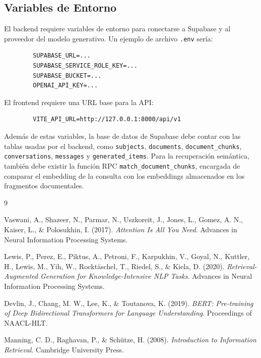 \documentclass[12pt, letterpaper]{article}
\begin{document}
	\subsection{Variables de Entorno}
	
	El backend requiere variables de entorno para conectarse a Supabase y al proveedor del modelo generativo. Un ejemplo de archivo \texttt{.env} sería:
	
	\begin{lstlisting}
		SUPABASE_URL=...
		SUPABASE_SERVICE_ROLE_KEY=...
		SUPABASE_BUCKET=...
		OPENAI_API_KEY=...
	\end{lstlisting}
	
	El frontend requiere una URL base para la API:
	
	\begin{lstlisting}
		VITE_API_URL=http://127.0.0.1:8000/api/v1
	\end{lstlisting}
	
	Además de estas variables, la base de datos de Supabase debe contar con las tablas usadas por el backend, como \texttt{subjects}, \texttt{documents}, \texttt{document\_chunks}, \texttt{conversations}, \texttt{messages} y \texttt{generated\_items}. Para la recuperación semántica, también debe existir la función RPC \texttt{match\_document\_chunks}, encargada de comparar el embedding de la consulta con los embeddings almacenados en los fragmentos documentales.
	
	
	
	
	\begin{thebibliography}{9}
		
		Vaswani, A., Shazeer, N., Parmar, N., Uszkoreit, J., Jones, L., Gomez, A. N., Kaiser, L., \& Polosukhin, I. (2017).
		\textit{Attention Is All You Need}.
		Advances in Neural Information Processing Systems.
		
		Lewis, P., Perez, E., Piktus, A., Petroni, F., Karpukhin, V., Goyal, N., Kuttler, H., Lewis, M., Yih, W., Rocktäschel, T., Riedel, S., \& Kiela, D. (2020).
		\textit{Retrieval-Augmented Generation for Knowledge-Intensive NLP Tasks}.
		Advances in Neural Information Processing Systems.
		
		Devlin, J., Chang, M. W., Lee, K., \& Toutanova, K. (2019).
		\textit{BERT: Pre-training of Deep Bidirectional Transformers for Language Understanding}.
		Proceedings of NAACL-HLT.
		
		Manning, C. D., Raghavan, P., \& Schütze, H. (2008).
		\textit{Introduction to Information Retrieval}.
		Cambridge University Press.
		
	\end{thebibliography}
	
\end{document}
